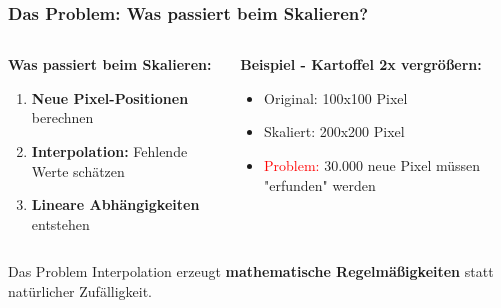 \documentclass[11pt,t,usepdftitle=false,aspectratio=169]{beamer}
\begin{document}
\begin{frame}
	\frametitle{Das Problem: Was passiert beim Skalieren?}
	\begin{columns}[T]
		\begin{column}{0.48\textwidth}
			\textbf{Was passiert beim Skalieren:}
			\begin{enumerate}
				\item \textbf{Neue Pixel-Positionen} berechnen
				\item \textbf{Interpolation:} Fehlende Werte schätzen
				\item \textbf{Lineare Abhängigkeiten} entstehen
			\end{enumerate}
		\end{column}
		\begin{column}{0.48\textwidth}
			\textbf{Beispiel - Kartoffel 2x vergrößern:}
			\begin{itemize}
				\item Original: 100x100 Pixel
				\item Skaliert: 200x200 Pixel  
				\item \textcolor{red}{Problem:} 30.000 neue Pixel müssen "erfunden" werden
			\end{itemize}
		\end{column}
	\end{columns}
	
	\vspace{1.5em}
	\begin{alertblock}{Das Problem}
		Interpolation erzeugt \textbf{mathematische Regelmäßigkeiten} statt natürlicher Zufälligkeit.
	\end{alertblock}
\end{frame}
\end{document}
